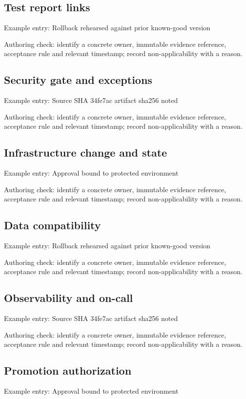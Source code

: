 \documentclass[10pt,letterpaper]{article}
\begin{document}
\subsection{Test report links}
Example entry: Rollback rehearsed against prior known-good version

Authoring check: identify a concrete owner, immutable evidence reference, acceptance rule and relevant timestamp; record non-applicability with a reason.


\subsection{Security gate and exceptions}
Example entry: Source SHA 34fe7ac artifact sha256 noted

Authoring check: identify a concrete owner, immutable evidence reference, acceptance rule and relevant timestamp; record non-applicability with a reason.


\subsection{Infrastructure change and state}
Example entry: Approval bound to protected environment

Authoring check: identify a concrete owner, immutable evidence reference, acceptance rule and relevant timestamp; record non-applicability with a reason.


\subsection{Data compatibility}
Example entry: Rollback rehearsed against prior known-good version

Authoring check: identify a concrete owner, immutable evidence reference, acceptance rule and relevant timestamp; record non-applicability with a reason.


\subsection{Observability and on-call}
Example entry: Source SHA 34fe7ac artifact sha256 noted

Authoring check: identify a concrete owner, immutable evidence reference, acceptance rule and relevant timestamp; record non-applicability with a reason.


\subsection{Promotion authorization}
Example entry: Approval bound to protected environment
\end{document}
